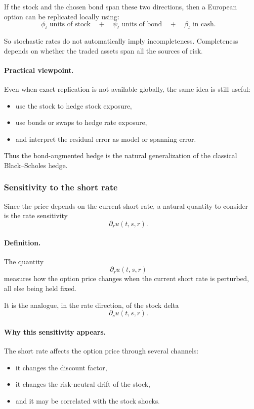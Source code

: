 \documentclass[11pt]{article}
\theoremstyle{plain}
\theoremstyle{definition}
\theoremstyle{remark}
\begin{document}
If the stock and the chosen bond span these two directions, then a
European option can be replicated locally using:
\[
\phi_t \text{ units of stock}
\quad + \quad
\psi_t \text{ units of bond}
\quad + \quad
\beta_t \text{ in cash.}
\]

So stochastic rates do not automatically imply incompleteness.
Completeness depends on whether the traded assets span all the sources of
risk.

\paragraph{Practical viewpoint.}
Even when exact replication is not available globally, the same idea is
still useful:
\begin{itemize}[leftmargin=1.4em]
    \item use the stock to hedge stock exposure,
    \item use bonds or swaps to hedge rate exposure,
    \item and interpret the residual error as model or spanning error.
\end{itemize}

Thus the bond-augmented hedge is the natural generalization of the
classical Black--Scholes hedge.

\subsubsection{Sensitivity to the short rate}

Since the price depends on the current short rate, a natural quantity to
consider is the rate sensitivity
\[
\partial_r u(t,s,r).
\]

\paragraph{Definition.}
The quantity
\[
\partial_r u(t,s,r)
\]
measures how the option price changes when the current short rate is
perturbed, all else being held fixed.

It is the analogue, in the rate direction, of the stock delta
\[
\partial_s u(t,s,r).
\]

\paragraph{Why this sensitivity appears.}
The short rate affects the option price through several channels:
\begin{itemize}[leftmargin=1.4em]
    \item it changes the discount factor,
    \item it changes the risk-neutral drift of the stock,
    \item and it may be correlated with the stock shocks.
\end{itemize}
\end{document}
